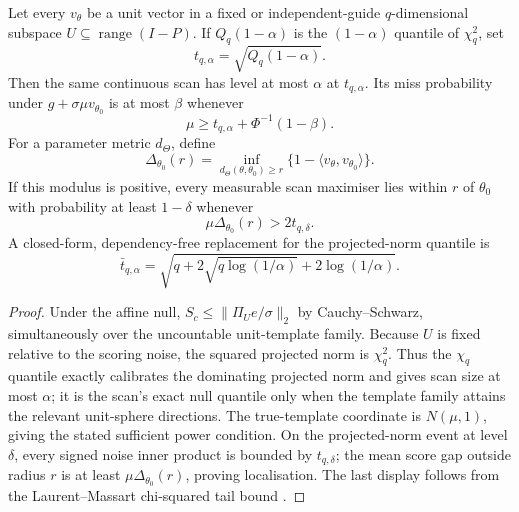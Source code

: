 \begin{theorem}
\label{thm:rank-scan}
Let every $v_\theta$ be a unit vector in a fixed or independent-guide
$q$-dimensional subspace
$U\subseteq\operatorname{range}(I-P)$.  If
$Q_q(1-\alpha)$ is the $(1-\alpha)$ quantile of $\chi_q^2$, set
\begin{equation}
 t_{q,\alpha}=\sqrt{Q_q(1-\alpha)}.
\end{equation}
Then the same continuous scan has level at most $\alpha$ at
$t_{q,\alpha}$.  Its miss probability under
$g+\sigma\mu v_{\theta_0}$ is at most $\beta$ whenever
\begin{equation}
 \mu\ge t_{q,\alpha}+\Phi^{-1}(1-\beta).
\end{equation}
For a parameter metric $d_\Theta$, define
\begin{equation}
 \Delta_{\theta_0}(r)=
 \inf_{d_\Theta(\theta,\theta_0)\ge r}
 \{1-\langle v_\theta,v_{\theta_0}\rangle\}.
\end{equation}
If this modulus is positive, every measurable scan maximiser lies within
$r$ of $\theta_0$ with probability at least $1-\delta$ whenever
\begin{equation}
 \mu\Delta_{\theta_0}(r)>2t_{q,\delta}.
\end{equation}
A closed-form, dependency-free replacement for the projected-norm quantile is
\begin{equation}
 \bar t_{q,\alpha}=
 \sqrt{q+2\sqrt{q\log(1/\alpha)}+2\log(1/\alpha)}.
\end{equation}
\end{theorem}
\begin{proof}
Under the affine null,
$S_c\le\|\Pi_U e/\sigma\|_2$ by Cauchy--Schwarz, simultaneously over the
uncountable unit-template family.  Because $U$ is fixed relative to the scoring
noise, the squared projected norm is $\chi_q^2$.  Thus the $\chi_q$ quantile
exactly calibrates the dominating projected norm and gives scan size at most
$\alpha$; it is the scan's exact null quantile only when the template family
attains the relevant unit-sphere directions.  The true-template coordinate
is $N(\mu,1)$, giving the stated sufficient power condition.  On the projected-norm
event at level $\delta$, every signed noise inner product is bounded by
$t_{q,\delta}$; the mean score gap outside radius $r$ is at least
$\mu\Delta_{\theta_0}(r)$, proving localisation.  The last display follows
from the Laurent--Massart chi-squared tail bound
\citep{laurent2000adaptive}.
\end{proof}

